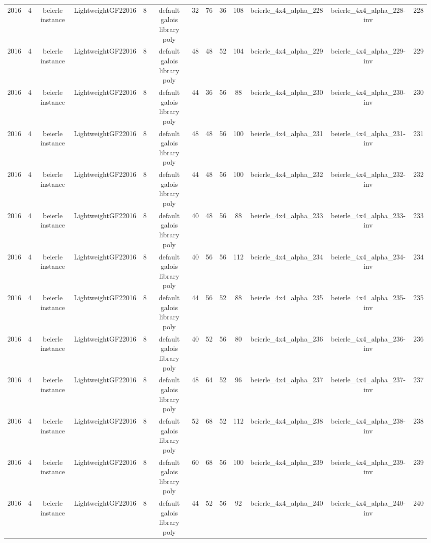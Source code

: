 \begin{tabular}{c c c c c c c c c c c c c}
2016 & 4 & beierle instance & LightweightGF22016 & 8 & default galois library poly & 32 & 76 & 36 & 108 & beierle_4x4_alpha_228 & beierle_4x4_alpha_228-inv & 228 \\
2016 & 4 & beierle instance & LightweightGF22016 & 8 & default galois library poly & 48 & 48 & 52 & 104 & beierle_4x4_alpha_229 & beierle_4x4_alpha_229-inv & 229 \\
2016 & 4 & beierle instance & LightweightGF22016 & 8 & default galois library poly & 44 & 36 & 56 & 88 & beierle_4x4_alpha_230 & beierle_4x4_alpha_230-inv & 230 \\
2016 & 4 & beierle instance & LightweightGF22016 & 8 & default galois library poly & 48 & 48 & 56 & 100 & beierle_4x4_alpha_231 & beierle_4x4_alpha_231-inv & 231 \\
2016 & 4 & beierle instance & LightweightGF22016 & 8 & default galois library poly & 44 & 48 & 56 & 100 & beierle_4x4_alpha_232 & beierle_4x4_alpha_232-inv & 232 \\
2016 & 4 & beierle instance & LightweightGF22016 & 8 & default galois library poly & 40 & 48 & 56 & 88 & beierle_4x4_alpha_233 & beierle_4x4_alpha_233-inv & 233 \\
2016 & 4 & beierle instance & LightweightGF22016 & 8 & default galois library poly & 40 & 56 & 56 & 112 & beierle_4x4_alpha_234 & beierle_4x4_alpha_234-inv & 234 \\
2016 & 4 & beierle instance & LightweightGF22016 & 8 & default galois library poly & 44 & 56 & 52 & 88 & beierle_4x4_alpha_235 & beierle_4x4_alpha_235-inv & 235 \\
2016 & 4 & beierle instance & LightweightGF22016 & 8 & default galois library poly & 40 & 52 & 56 & 80 & beierle_4x4_alpha_236 & beierle_4x4_alpha_236-inv & 236 \\
2016 & 4 & beierle instance & LightweightGF22016 & 8 & default galois library poly & 48 & 64 & 52 & 96 & beierle_4x4_alpha_237 & beierle_4x4_alpha_237-inv & 237 \\
2016 & 4 & beierle instance & LightweightGF22016 & 8 & default galois library poly & 52 & 68 & 52 & 112 & beierle_4x4_alpha_238 & beierle_4x4_alpha_238-inv & 238 \\
2016 & 4 & beierle instance & LightweightGF22016 & 8 & default galois library poly & 60 & 68 & 56 & 100 & beierle_4x4_alpha_239 & beierle_4x4_alpha_239-inv & 239 \\
2016 & 4 & beierle instance & LightweightGF22016 & 8 & default galois library poly & 44 & 52 & 56 & 92 & beierle_4x4_alpha_240 & beierle_4x4_alpha_240-inv & 240 \\

\end{tabular}
